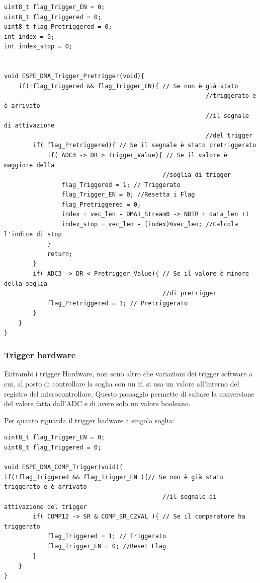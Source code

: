 \noindent
\begin{verbatim}
uint8_t flag_Trigger_EN = 0;
uint8_t flag_Triggered = 0;
uint8_t flag_Pretriggered = 0;
int index = 0;
int index_stop = 0;


void ESPE_DMA_Trigger_Pretrigger(void){
    if(!flag_Triggered && flag_Trigger_EN){ // Se non è già stato
                                                        //triggerato e è arrivato
                                                        //il segnale di attivazione
                                                        //del trigger
        if( flag_Pretriggered){ // Se il segnale è stato pretriggerato
            if( ADC3 -> DR > Trigger_Value){ // Se il valore è maggiore della
                                            //soglia di trigger
                flag_Triggered = 1; // Triggerato
                flag_Trigger_EN = 0; //Resetta i Flag
                flag_Pretriggered = 0;
                index = vec_len - DMA1_Stream0 -> NDTR + data_len +1
                index_stop = vec_len - (index)%vec_len; //Calcola l'indice di stop
            }
            return;
        }
        if( ADC3 -> DR < Pretrigger_Value){ // Se il valore è minore della soglia
                                            //di pretrigger
            flag_Pretriggered = 1; // Pretriggerato
        }
    }
}
\end{verbatim}

\subsubsection{Trigger hardware}
Entrambi i trigger Hardware, non sono altro che variazioni dei trigger software a cui, al posto di controllare la soglia con un if, si usa un valore all'interno del registro del microcontrollore. Questo passaggio permette di saltare la conversione del valore fatta dall'ADC e di avere solo un valore booleano.


Per quanto riguarda il trigger hadware a singola soglia:
\noindent
\begin{verbatim}
uint8_t flag_Trigger_EN = 0;
uint8_t flag_Triggered = 0;

void ESPE_DMA_COMP_Trigger(void){
if(!flag_Triggered && flag_Trigger_EN ){// Se non è già stato triggerato e è arrivato
                                            //il segnale di attivazione del trigger
        if( COMP12 -> SR & COMP_SR_C2VAL ){ // Se il comparatore ha triggerato
            flag_Triggered = 1; // Triggerato
            flag_Trigger_EN = 0; //Reset Flag
        }
    }
}
\end{verbatim}

